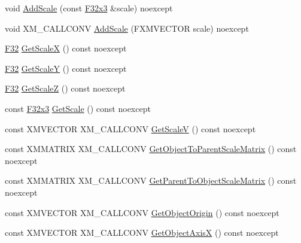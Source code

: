 \begin{DoxyCompactItemize}
\item 
void \mbox{\hyperlink{classmage_1_1_local_transform_a3bf03266ca3266cd1eecab3b3dd73e77}{Add\+Scale}} (const \mbox{\hyperlink{namespacemage_a1e3c7a882af461f161caa1cbddaf1fa2}{F32x3}} \&scale) noexcept
\item 
void X\+M\+\_\+\+C\+A\+L\+L\+C\+O\+NV \mbox{\hyperlink{classmage_1_1_local_transform_a1c2ae4604dfd52b8a58356eb78ac99bf}{Add\+Scale}} (F\+X\+M\+V\+E\+C\+T\+OR scale) noexcept
\item 
\mbox{\hyperlink{namespacemage_aa97e833b45f06d60a0a9c4fc22ae02c0}{F32}} \mbox{\hyperlink{classmage_1_1_local_transform_ad539c04b897276a35bd3f25ad2163371}{Get\+ScaleX}} () const noexcept
\item 
\mbox{\hyperlink{namespacemage_aa97e833b45f06d60a0a9c4fc22ae02c0}{F32}} \mbox{\hyperlink{classmage_1_1_local_transform_a8c15528f78365b5dc853d1e9035b4cc4}{Get\+ScaleY}} () const noexcept
\item 
\mbox{\hyperlink{namespacemage_aa97e833b45f06d60a0a9c4fc22ae02c0}{F32}} \mbox{\hyperlink{classmage_1_1_local_transform_a79225f12e49fce5d16653ad2671a7e97}{Get\+ScaleZ}} () const noexcept
\item 
const \mbox{\hyperlink{namespacemage_a1e3c7a882af461f161caa1cbddaf1fa2}{F32x3}} \mbox{\hyperlink{classmage_1_1_local_transform_a5dbf74dae200448b0993504d23f99f1c}{Get\+Scale}} () const noexcept
\item 
const X\+M\+V\+E\+C\+T\+OR X\+M\+\_\+\+C\+A\+L\+L\+C\+O\+NV \mbox{\hyperlink{classmage_1_1_local_transform_a6c70ee804326d0b5ff54d282630972bc}{Get\+ScaleV}} () const noexcept
\item 
const X\+M\+M\+A\+T\+R\+IX X\+M\+\_\+\+C\+A\+L\+L\+C\+O\+NV \mbox{\hyperlink{classmage_1_1_local_transform_acd4fda032325f52cb668fc4733c6bc04}{Get\+Object\+To\+Parent\+Scale\+Matrix}} () const noexcept
\item 
const X\+M\+M\+A\+T\+R\+IX X\+M\+\_\+\+C\+A\+L\+L\+C\+O\+NV \mbox{\hyperlink{classmage_1_1_local_transform_a81ef828c64270716e5095f2cf571fad7}{Get\+Parent\+To\+Object\+Scale\+Matrix}} () const noexcept
\item 
const X\+M\+V\+E\+C\+T\+OR X\+M\+\_\+\+C\+A\+L\+L\+C\+O\+NV \mbox{\hyperlink{classmage_1_1_local_transform_abaa858e23864984b339b2fa26607c026}{Get\+Object\+Origin}} () const noexcept
\item 
const X\+M\+V\+E\+C\+T\+OR X\+M\+\_\+\+C\+A\+L\+L\+C\+O\+NV \mbox{\hyperlink{classmage_1_1_local_transform_a369350f17dbf41afa8278643bb641125}{Get\+Object\+AxisX}} () const noexcept
\item 

\end{DoxyCompactItemize}
